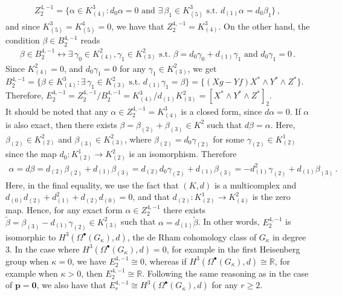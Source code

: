 \documentclass[10pt]{amsart}
\theoremstyle{remark}
\numberwithin{equation}{section}
\begin{document}
\begin{align*}
    Z^{4,-1}_2=\lbrace\alpha\in K^3_{(4)}: d_0\alpha=0\text{ and }\exists\,\beta_1\in K_{(5)}^3\text{ s.t. }d_{(1)}\alpha=d_0\beta_1\rbrace\,,
\end{align*} and since $K_{(5)}^3=K_{(5)}^4=0$, we have that $ Z_2^{4,-1}=K_{(4)}^3$. On the other hand, the condition $\beta\in B_2^{4,-1}$ reads
\begin{align*}
    \beta\in B_2^{4,-1}\longleftrightarrow\exists\, \gamma_0\in K_{(4)}^2,\gamma_1\in K_{(3)}^2\text{ s.t. }\beta=d_0\gamma_0+d_{(1)}\gamma_1\text{ and }d_0\gamma_1=0\,.
\end{align*}
Since $K_{(4)}^2=0$, and $d_0\gamma_1=0$ for any $\gamma_1\in K_{(3)}^2$, we get $B^{4,-1}_2=\lbrace\beta\in K_{(4)}^3: \exists\, \gamma_1\in K_{(3)}^2\text{ s.t. }d_{(1)}\gamma_1=\beta\rbrace=\lbrace (Xg-Yf)X^\ast\wedge Y^\ast\wedge Z^\ast\rbrace$. \\
Therefore, 
$E_2^{4,-1}=Z_2^{4,-1}/B_2^{4,-1}=K_{(4)}^3/ d_{(1)}K_{(3)}^2=[X^\ast\wedge Y^\ast\wedge Z^\ast]_2$.\\
It should be noted that any $\alpha\in Z_2^{4,-1}=K_{(4)}^3$ is a closed form, since $d\alpha=0$. If $\alpha$ is also exact, then there exists $\beta=\beta_{(2)}+\beta_{(3)}\in K^2$  such that $d\beta=\alpha$. Here, $\beta_{(2)}\in K_{(2)}^2$ and $\beta_{(3)}\in K_{(3)}^2$, where $\beta_{(2)}=d_0\gamma_{(2)}$ for some $\gamma_{(2)}\in K_{(2)}^1$ since the map $d_0\colon K_{(2)}^1\to K_{(2)}^2$ is an isomorphism. Therefore
\begin{align*}
    \alpha=d\beta=d_{(2)}\beta_{(2)}+d_{(1)}\beta_{(3)}=d_{(2)}d_0\gamma_{(2)}+d_{(1)}\beta_{(3)}=-d_{(1)}^2\gamma_{(2)}+d_{(1)}\beta_{(3)}\,.
\end{align*}
Here, in the final equality, we use the fact that $(K,d)$ is a multicomplex and $d_{(0)}d_{(2)}+d_{(1)}^2+d_{(2)}d_{(0)}=0$, and that $d_{(2)}\colon K_{(2)}^1\to K_{(4)}^2$ is the zero map. Hence, for any exact form $\alpha\in Z_2^{4,-1}$ there exists $\tilde\beta=\beta_{(3)}-d_{(1)}\gamma_{(2)}\in K_{(3)}^2$ such that $\alpha=d_{(1)}\tilde\beta$. In other words, $E_{2}^{4,-1}$ is isomorphic to $H^3(\Omega^\bullet(G_\kappa),d)$, the de Rham cohomology class of $G_\kappa$ in degree 3. In the case where $H^3(\Omega^\bullet(G_\kappa),d)=0$, for example in the first Heisenberg group when $\kappa=0$, we have $E_2^{4,-1}\cong 0$, whereas if $H^3(\Omega^\bullet(G_\kappa),d)\cong \mathbb R$, for example when $\kappa >0$, then $E_2^{4,-1}\cong\mathbb R$. Following the same reasoning as in the case of $\mathbf{p=0}$, we also have that $E^{4,-1}_r\cong H^3(\Omega^\bullet(G_\kappa),d)$ for any $r\ge 2$.
\end{document}
